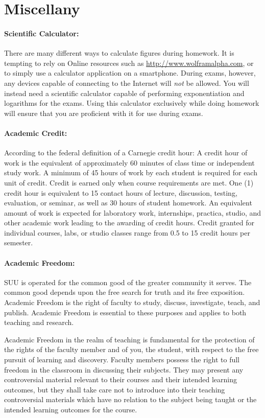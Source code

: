 \documentclass[12pt, letterpaper]{article}
\begin{document}
\section*{Miscellany}
\paragraph{Scientific Calculator:}
There are many different ways to calculate figures during homework. It is tempting to rely on Online resources such as \href{http://www.wolframalpha.com}{http://www.wolframalpha.com}, or to simply use a calculator application on a smartphone. During exams, however, any devices capable of connecting to the Internet will \emph{not} be allowed. You will instead need a scientific calculator capable of performing exponentiation and logarithms for the exams. Using this calculator exclusively while doing homework will ensure that you are proficient with it for use during exams.

\paragraph{Academic Credit:}
According to the federal definition of a Carnegie credit hour: A credit hour of work is the equivalent of approximately 60 minutes of class time or independent study work. A minimum of 45 hours of work by each student is required for each unit of credit. Credit is earned only when course requirements are met. One (1) credit hour is equivalent to 15 contact hours of lecture, discussion, testing, evaluation, or seminar, as well as 30 hours of student homework. An equivalent amount of work is expected for laboratory work, internships, practica, studio, and other academic work leading to the awarding of credit hours. Credit granted for individual courses, labs, or studio classes range from 0.5 to 15 credit hours per semester.

\paragraph{Academic Freedom:}
SUU is operated for the common good of the greater community it serves. The common good depends upon the free search for truth and its free exposition. Academic Freedom is the right of faculty to study, discuss, investigate, teach, and publish. Academic Freedom is essential to these purposes and applies to both teaching and research.

\noindent
Academic Freedom in the realm of teaching is fundamental for the protection of the rights of the faculty member and of you, the student, with respect to the free pursuit of learning and discovery. Faculty members possess the right to full freedom in the classroom in discussing their subjects. They may present any controversial material relevant to their courses and their intended learning outcomes, but they shall take care not to introduce into their teaching controversial materials which have no relation to the subject being taught or the intended learning outcomes for the course.
\end{document}
